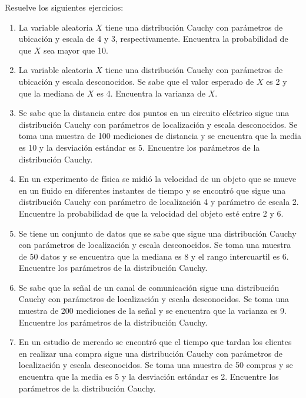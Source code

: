 \begin{Ejer}
Resuelve los siguientes ejercicios:
\begin{enumerate}

\item La variable aleatoria $X$ tiene una distribuci\'on Cauchy con par\'ametros de ubicaci\'on y escala de 4 y 3, respectivamente. Encuentra la probabilidad de que $X$ sea mayor que 10.

\item La variable aleatoria $X$ tiene una distribuci\'on Cauchy con par\'ametros de ubicaci\'on y escala desconocidos. Se sabe que el valor esperado de $X$ es 2 y que la mediana de $X$ es 4. Encuentra la varianza de $X$.

\item Se sabe que la distancia entre dos puntos en un circuito el\'ectrico sigue una distribuci\'on Cauchy con par\'ametros de localizaci\'on y escala desconocidos. Se toma una muestra de 100 mediciones de distancia y se encuentra que la media es 10 y la desviaci\'on est\'andar es 5. Encuentre los par\'ametros de la distribuci\'on Cauchy.

\item En un experimento de f\'isica se midi\'o la velocidad de un objeto que se mueve en un fluido en diferentes instantes de tiempo y se encontr\'o que sigue una distribuci\'on Cauchy con par\'ametro de localizaci\'on 4 y par\'ametro de escala 2. Encuentre la probabilidad de que la velocidad del objeto est\'e entre 2 y 6.

\item Se tiene un conjunto de datos que se sabe que sigue una distribuci\'on Cauchy con par\'ametros de localizaci\'on y escala desconocidos. Se toma una muestra de 50 datos y se encuentra que la mediana es 8 y el rango intercuartil es 6. Encuentre los par\'ametros de la distribuci\'on Cauchy.

\item Se sabe que la se\~nal de un canal de comunicaci\'on sigue una distribuci\'on Cauchy con par\'ametros de localizaci\'on y escala desconocidos. Se toma una muestra de 200 mediciones de la se\~nal y se encuentra que la varianza es 9. Encuentre los par\'ametros de la distribuci\'on Cauchy.

\item En un estudio de mercado se encontr\'o que el tiempo que tardan los clientes en realizar una compra sigue una distribuci\'on Cauchy con par\'ametros de localizaci\'on y escala desconocidos. Se toma una muestra de 50 compras y se encuentra que la media es 5 y la desviaci\'on est\'andar es 2. Encuentre los par\'ametros de la distribuci\'on Cauchy.


\end{enumerate}
\end{Ejer}
